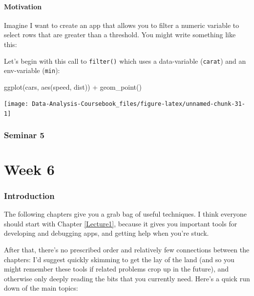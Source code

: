 \documentclass[
]{article}
\newenvironment{Shaded}{\begin{snugshade}}{\end{snugshade}}
\newcommand{\FunctionTok}[1]{\textcolor[rgb]{0.00,0.00,0.00}{#1}}
\newcommand{\NormalTok}[1]{#1}
\newcommand{\SpecialCharTok}[1]{\textcolor[rgb]{0.00,0.00,0.00}{#1}}
\begin{document}
\hypertarget{tidy-motivation}{%
\subsection{Motivation}\label{tidy-motivation}}

Imagine I want to create an app that allows you to filter a numeric variable to select rows that are greater than a threshold.
You might write something like this:

Let's begin with this call to \texttt{filter()} which uses a data-variable (\texttt{carat}) and an env-variable (\texttt{min}):

\begin{Shaded}
\begin{Highlighting}[]
\FunctionTok{ggplot}\NormalTok{(cars, }\FunctionTok{aes}\NormalTok{(speed, dist)) }\SpecialCharTok{+} 
  \FunctionTok{geom\_point}\NormalTok{()}
\end{Highlighting}
\end{Shaded}

\begin{center}\texttt{[image: Data-Analysis-Coursebook\_files/figure-latex/unnamed-chunk-31-1]} \end{center}

\hypertarget{seminar5}{%
\section{Seminar 5}\label{seminar5}}

\hypertarget{part-week-6}{%
\part*{Week 6}\label{part-week-6}}

\hypertarget{week6-intro}{%
\section*{Introduction}\label{week6-intro}}

The following chapters give you a grab bag of useful techniques.
I think everyone should start with Chapter \ref{Lecture1}, because it gives you important tools for developing and debugging apps, and getting help when you're stuck.

After that, there's no prescribed order and relatively few connections between the chapters: I'd suggest quickly skimming to get the lay of the land (and so you might remember these tools if related problems crop up in the future), and otherwise only deeply reading the bits that you currently need.
Here's a quick run down of the main topics:
\end{document}
